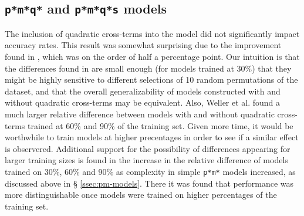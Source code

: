 \subsection{\texttt{p*m*q*} and \texttt{p*m*q*s} models}

The inclusion of quadratic cross-terms into the model did not significantly
impact accuracy rates. This result was somewhat surprising due to the
improvement found in \cite{Weller_structuredprediction}, which was on the order
of half a percentage point. Our intuition is that the differences found in
\cite{Weller_structuredprediction} are small enough (for models trained at
30\%) that they might be highly sensitive to different selections of 10 random
permutations of the dataset, and that the overall generalizability of models
constructed with and without quadratic cross-terms may be equivalent. Also,
Weller et al. found a much larger relative difference between models with and
without quadratic cross-terms trained at 60\% and 90\% of the training set.
Given more time, it would be worthwhile to train models at higher precentages
in order to see if a similar effect is observered. Additional support for the
possibility of differences appearing for larger training sizes is found in the
increase in the relative difference of models trained on 30\%, 60\% and 90\% as
complexity in simple \texttt{p*m*} models increased, as discussed above in \S
\ref{ssec:pm-models}. There it was found that performance was more
distinguishable once models were trained on higher percentages of the training
set.



